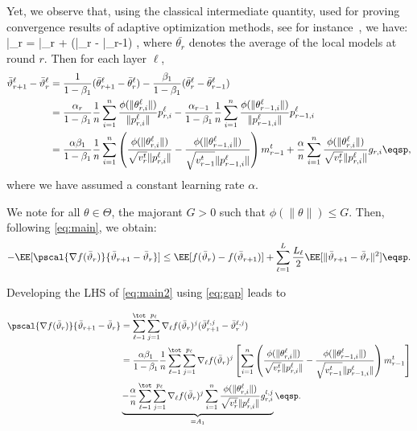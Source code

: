 \documentclass[11pt]{article}
\begin{document}
Yet, we observe that, using the classical intermediate quantity, used for proving convergence results of adaptive optimization methods, see for instance~\citep{RKK18}, we have:
\beq\label{eq:defseq}
\bar{\vartheta}_r = \bar{\theta}_r +  (\bar{\theta}_{r} - \bar{\theta}_{r-1}) \eqsp,
\eeq
where $\bar{\theta_r}$ denotes the average of the local models at round $r$.
Then for each layer $\ell$,
\begin{align}\label{eq:gap}
\bar{\vartheta}^\ell_{r+1} - \bar{\vartheta}^\ell_r  & = \frac{1}{1-\beta_1}(\bar{\theta}^\ell_{r+1} - \bar{\theta}^\ell_{r}) - \frac{\beta_1}{1-\beta_1}(\bar{\theta}^\ell_{r} - \bar{\theta}^\ell_{r-1})\\
& = \frac{\alpha_{r}}{1-\beta_1} \frac{1}{n} \sum_{i = 1}^n \frac{\phi(\|\theta_{r,i}^{\ell}\|)}{\|p_{r,i}^{\ell}\|} p_{r,i}^{\ell}  - \frac{\alpha_{r-1}}{1-\beta_1} \frac{1}{n} \sum_{i = 1}^n \frac{\phi(\|\theta_{r-1,i}^{\ell}\|)}{\|p_{r-1,i}^{\ell}\|} p_{r-1,i}^{\ell}\\
& = \frac{\alpha \beta_1}{1-\beta_1} \frac{1}{n}  \sum_{i = 1}^n  \left( \frac{\phi(\|\theta_{r,i}^{\ell}\|)}{\sqrt{v^{t}_{r}} \|p_{r,i}^{\ell}\|} - \frac{\phi(\|\theta_{r-1,i}^{\ell}\|)}{\sqrt{v^{t}_{r-1}} \|p_{r-1,i}^{\ell}\|} \right) m^{t}_{r-1} + \frac{\alpha}{n} \sum_{i = 1}^n \frac{\phi(\|\theta_{r,i}^{\ell}\|)}{\sqrt{v^{t}_{r}} \|p_{r,i}^{\ell}\|} g_{r,i} \eqsp,
\end{align}
where we have assumed a constant learning rate $\alpha$.


We note for all $\theta \in \Theta$, the majorant $G > 0$ such that $\phi(\|\theta \|) \leq G$. 
Then, following \eqref{eq:main}, we obtain:
\begin{align}\label{eq:main2}
- \EE[  \pscal{\nabla f(\bar{\vartheta}_r)}{\bar{\vartheta}_{r+1} - \bar{\vartheta}_r}]  \leq  \EE[ f(\bar{\vartheta}_r) - f(\bar{\vartheta}_{r+1})] + \sum_{\ell =1}^L \frac{L_\ell}{2} \EE[  \| \bar{\vartheta}_{r+1} - \bar{\vartheta}_r \|^2] \eqsp.
\end{align}

Developing the LHS of \eqref{eq:main2} using \eqref{eq:gap} leads to

\begin{align}\label{eq:inner}
\pscal{\nabla f(\bar{\vartheta}_r)}{\bar{\vartheta}_{r+1} - \bar{\vartheta}_r} &= \sum_{\ell=1}^\tot \sum_{j=1}^{p_\ell} \nabla_{\ell} f(\bar{\vartheta}_r)^j (\bar{\vartheta}^{\ell,j}_{r+1} - \bar{\vartheta}^{\ell,j}_r) \\
& =  \frac{\alpha \beta_1}{1-\beta_1}\frac{1}{n}  \sum_{\ell=1}^\tot \sum_{j=1}^{p_\ell} \nabla_{\ell} f(\bar{\vartheta}_r)^j \left[   \sum_{i = 1}^n  \left( \frac{\phi(\|\theta_{r,i}^{\ell}\|)}{\sqrt{v^{t}_{r}} \|p_{r,i}^{\ell}\|} - \frac{\phi(\|\theta_{r-1,i}^{\ell}\|)}{\sqrt{v^{t}_{r-1}} \|p_{r-1,i}^{\ell}\|} \right) m^{t}_{r-1}  \right] \\
& \underbrace{ -\frac{\alpha}{n} \sum_{\ell=1}^\tot \sum_{j=1}^{p_\ell} \nabla_{\ell} f(\bar{\vartheta}_r)^j  \sum_{i = 1}^n \frac{\phi(\|\theta_{r,i}^{\ell}\|)}{\sqrt{v^{t}_{r}} \|p_{r,i}^{\ell}\|} g_{r,i}^{l,j}}_{= A_1}   \label{eqn1} \eqsp.
\end{align}
\end{document}
